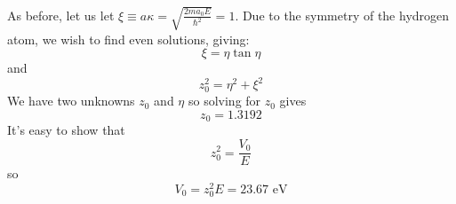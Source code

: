 \begin{sol}
As before, let us let $\xi\equiv a\kappa = \sqrt{\frac{2ma_0E}{\hbar^2}}=1$. Due to the symmetry of the hydrogen atom, we wish to find even solutions, giving:
$$\xi=\eta \tan \eta$$
and
$$z_0^2=\eta^2+\xi^2$$
We have two unknowns $z_0$ and $\eta$ so solving for $z_0$ gives
$$z_0=1.3192$$
It's easy to show that
$$z_0^2=\frac{V_0}{E}$$
so
$$V_0=z_0^2E = 23.67 \text{ eV}$$
\end{sol}